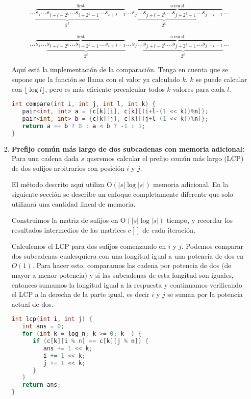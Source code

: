 \begin{enumerate}
	$$\dots \overbrace{\underbrace{s_i \dots s_{i+l-2^k} \dots s_{i+2^k-1}}_{2^k} \dots s_{i+l-1}}^{\text{first}} \dots \overbrace{\underbrace{s_j \dots s_{j+l-2^k} \dots s_{j+2^k-1}}_{2^k} \dots s_{j+l-1}}^{\text{second}} \dots$$
	
	$$\dots \overbrace{s_i \dots \underbrace{s_{i+l-2^k} \dots s_{i+2^k-1} \dots s_{i+l-1}}_{2^k}}^{\text{first}} \dots \overbrace{s_j \dots \underbrace{s_{j+l-2^k} \dots s_{j+2^k-1} \dots s_{j+l-1}}_{2^k}}^{\text{second}} \dots$$
	
	Aquí está la implementación de la comparación. Tenga en cuenta que se supone que la función se llama con el valor ya calculado $k$. $k$ se puede calcular
	con $\lfloor \log l \rfloor$, pero es más eficiente precalcular todos $k$ valores para cada $l$.

\begin{lstlisting}[language=C++]	
int compare(int i, int j, int l, int k) {
   pair<int, int> a = {c[k][i], c[k][(i+l-(1 << k))%n]};
   pair<int, int> b = {c[k][j], c[k][(j+l-(1 << k))%n]};
   return a == b ? 0 : a < b ? -1 : 1;
}
\end{lstlisting}	

	\item \textbf{Prefijo común más largo de dos subcadenas con memoria adicional:} Para una cadena dada $s$ queremos calcular el prefijo común más largo (LCP) 
	de dos sufijos arbitrarios con posición $i$ y $j$.
	
	El método descrito aquí utiliza O$(|s|\log|s|)$ memoria adicional. En la siguiente sección se describe un enfoque completamente diferente que solo 
	utilizará una cantidad lineal de memoria.
	
	Construimos la matriz de sufijos en O$(|s|\log|s|)$ tiempo, y recordar los resultados intermedios de las matrices $c[]$ de cada iteración.
	
	Calculemos el LCP para dos sufijos comenzando en $i$ y $j$. Podemos comparar dos subcadenas cualesquiera con una longitud igual a una potencia de dos en $O(1)$. Para hacer esto, comparamos las cadena por potencia de dos (de mayor a menor potencia) y si las subcadenas de esta longitud son iguales, entonces 
	sumamos la longitud igual a la respuesta y continuamos verificando el LCP a la derecha de la parte igual, es decir $i$ y $j$ se suman por la potencia  actual de dos.
	
\begin{lstlisting}[language=C++]	
int lcp(int i, int j) {
   int ans = 0;
   for (int k = log_n; k >= 0; k--) {
      if (c[k][i % n] == c[k][j % n]) {
         ans += 1 << k;
         i += 1 << k;
         j += 1 << k;
      }
   }
   return ans;
}
\end{lstlisting}



\end{enumerate}
